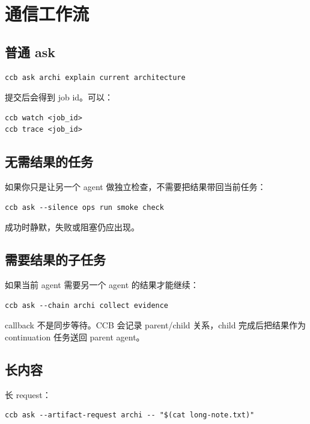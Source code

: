 \chapter{通信工作流}

\section{普通 ask}

\begin{lstlisting}
ccb ask archi explain current architecture
\end{lstlisting}

提交后会得到 job id。可以：

\begin{lstlisting}
ccb watch <job_id>
ccb trace <job_id>
\end{lstlisting}

\section{无需结果的任务}

如果你只是让另一个 agent 做独立检查，不需要把结果带回当前任务：

\begin{lstlisting}
ccb ask --silence ops run smoke check
\end{lstlisting}

成功时静默，失败或阻塞仍应出现。

\section{需要结果的子任务}

如果当前 agent 需要另一个 agent 的结果才能继续：

\begin{lstlisting}
ccb ask --chain archi collect evidence
\end{lstlisting}

callback 不是同步等待。CCB 会记录 parent/child 关系，child 完成后把结果作为 continuation 任务送回 parent agent。

\section{长内容}

长 request：

\begin{lstlisting}
ccb ask --artifact-request archi -- "$(cat long-note.txt)"
\end{lstlisting}

